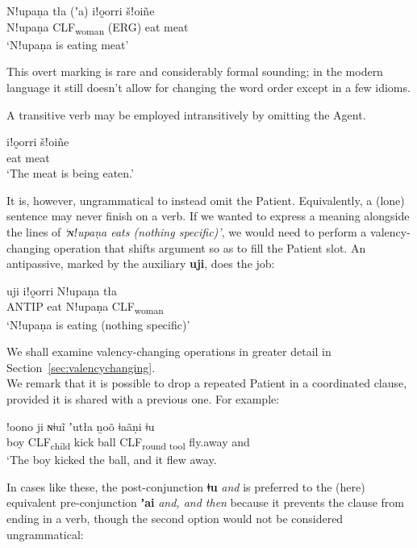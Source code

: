 \documentclass[11pt,a5paper]{book}
\newcommand{\qcn}[1]{\textcolor{AccentText}{\large\textbf{#1}}}
\newcommand{\transl}[2]{\qcn{#1} \emph{#2}}
\newcommand{\grammsc}[1]{\textsc{#1}}
\newcommand{\CLF}[1]{\grammsc{CLF}\textsubscript{#1}}
\newcommand{\ERG}{\grammsc{ERG}}
\begin{document}
\begin{exe}
	\ex
	\gll Nǃupaṇa 	tła  (ʼa)	iǃo̰orri  	šǃoiñe \\
		Nǃupaṇa 	\CLF{woman} (\ERG) 	eat 	meat\\
	\glt `Nǃupaṇa is eating meat'
\end{exe}

This overt marking is rare and considerably formal sounding; in the modern language it still doesn't allow for changing the word order except in a few idioms.

A transitive verb may be employed intransitively by omitting the Agent.

\begin{exe}
	\ex
	\gll iǃo̰orri 	šǃoiñe\\
eat 	meat\\
\glt `The meat is being eaten.'
\end{exe}

It is, however, ungrammatical to instead omit the Patient. Equivalently, a (lone) sentence may never finish on a verb. If we wanted to express a meaning alongside the lines of \emph{`ɴǃupaṇa eats (nothing specific)'}, we would need to perform a valency-changing operation that shifts argument so as to fill the Patient slot. An antipassive, marked by the auxiliary \qcn{uji}, does the job:

\begin{exe}
	\ex
	\gll  uji 	iǃo̰orri Nǃupaṇa 	tła  \\
	ANTIP eat	Nǃupaṇa 	\CLF{woman} 	\\
	\glt `Nǃupaṇa is eating (nothing specific)'
\end{exe}

We shall examine valency-changing operations in greater detail in Section~\ref{sec:valencychanging}.\\

We remark that it is possible to drop a repeated Patient in a coordinated clause, provided it is shared with a previous one. For example:

\begin{exe}
\ex
\gll !oono 	ji 	ɴǂuĩ 	 	ʼutła 	ṉoõ  ǂaãṇi ǂu\\
boy 	\CLF{child} 	kick 	ball 	\CLF{round tool} 	fly.away  and\\
\glt `The boy kicked the ball, and it flew away.
\end{exe}

In cases like these, the post-conjunction \transl{ǂu}{and} is preferred to the (here) equivalent pre-conjunction \transl{ʼai}{and, and then} because it prevents the clause from ending in a verb, though the second option would not be considered ungrammatical:
\end{document}

